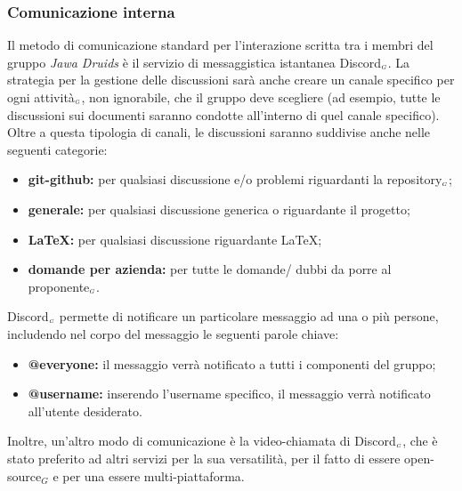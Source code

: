 \subsubsection{Comunicazione interna}\label{ProcessiOrganizzativiProcessoDiCoordinamentoComunicazioneInterna}
Il metodo di comunicazione standard per l'interazione scritta tra i membri del gruppo \textit{Jawa Druids} è il servizio di messaggistica istantanea Discord$_{\scaleto{G}{3pt}}$.
La strategia per la gestione delle discussioni sarà anche creare un canale specifico per ogni attività$_{\scaleto{G}{3pt}}$, non ignorabile, che il gruppo deve scegliere (ad esempio, tutte le discussioni sui documenti saranno condotte all'interno di quel canale specifico).
Oltre a questa tipologia di canali, le discussioni saranno suddivise anche nelle seguenti categorie:
\begin{itemize}
\item \textbf{git-github:} per qualsiasi discussione e/o problemi riguardanti la repository$_{\scaleto{G}{3pt}}$;
	\item\textbf{generale:} per qualsiasi discussione generica o riguardante il progetto;
	\item\textbf{\LaTeX:} per qualsiasi discussione riguardante \LaTeX;
	\item\textbf{domande per azienda:} per tutte le domande/ dubbi da porre al proponente$_{\scaleto{G}{3pt}}$.
\end{itemize}
Discord$_{\scaleto{G}{3pt}}$ permette di notificare un particolare messaggio ad una o più persone, includendo nel corpo del messaggio le seguenti parole chiave:
\begin{itemize}
\item \textbf{@everyone:} il messaggio verrà notificato a tutti i componenti del gruppo;
	\item \textbf{@username:} inserendo l'username specifico, il messaggio verrà notificato all'utente desiderato.
\end{itemize}
Inoltre, un'altro modo di comunicazione è la video-chiamata di Discord$_{\scaleto{G}{3pt}}$, che è stato preferito ad altri servizi per la sua versatilità, per il fatto di essere open-source$_G$ e per una essere multi-piattaforma.	
